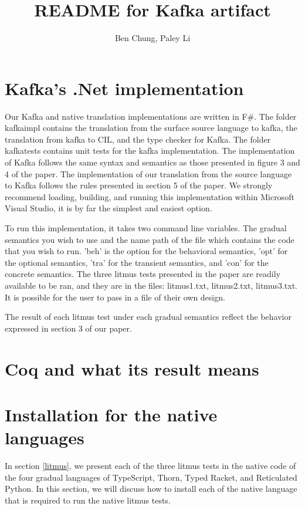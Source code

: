 \documentclass[]{article}
\title{README for Kafka artifact}
\author{Ben Chung, Paley Li}
\date{}
\begin{document}
\maketitle

\section{Kafka's .Net implementation}

Our Kafka and native translation implementations are written in F$\#$. The folder kafkaimpl contains the translation from the surface source language to kafka, the translation from kafka to CIL, and the type checker for Kafka. The folder kafkatests contains unit tests for the kafka implementation. The implementation of Kafka follows the same syntax and semantics as those presented in figure 3 and 4 of the paper. The implementation of our translation from the source language to Kafka follows the rules presented in section 5 of the paper. We strongly recommend loading, building, and running this implementation within Microsoft Visual Studio, it is by far the simplest and easiest option. 

To run this implementation, it takes two command line variables. The gradual semantics you wish to use and the name path of the file which contains the code that you wish to run. 'beh' is the option for the behavioral semantics, 'opt' for the optional semantics, 'tra' for the transient semantics, and 'con' for the concrete semantics. The three litmus tests presented in the paper are readily available to be ran, and they are in the files: litmus1.txt, litmus2.txt, litmus3.txt. It is possible for the user to pass in a file of their own design.

The result of each litmus test under each gradual semantics reflect the behavior expressed in section 3 of our paper.


\section{Coq and what its result means}


\section{Installation for the native languages}

In section \ref{litmus}, we present each of the three litmus tests in the native code of the four gradual languages of TypeScript, Thorn, Typed Racket, and Reticulated Python. In this section, we will discuss how to install each of the native language that is required to run the native litmus tests.
\end{document}

